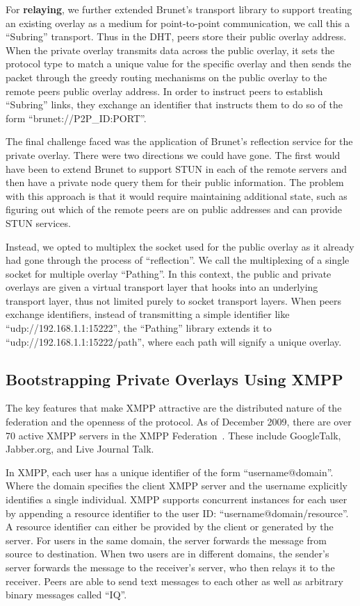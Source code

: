 \documentclass[conference]{IEEEtran}
\begin{document}
For \textbf{relaying}, we further extended Brunet's transport library to
support treating an existing overlay as a medium for point-to-point
communication, we call this a ``Subring'' transport.  Thus in the DHT, peers
store their public overlay address.  When the private overlay transmits data
across the public overlay, it sets the protocol type to match a unique value
for the specific overlay and then sends the packet through the greedy routing
mechanisms on the public overlay to the remote peers public overlay address.
In order to instruct peers to establish ``Subring'' links, they exchange an
identifier that instructs them to do so of the form ``brunet://P2P\_ID:PORT''.

The final challenge faced was the application of Brunet's reflection service
for the private overlay.  There were two directions we could have gone.  The
first would have been to extend Brunet to support STUN in each of the remote
servers and then have a private node query them for their public information.
The problem with this approach is that it would require maintaining additional
state, such as figuring out which of the remote peers are on public addresses
and can provide STUN services.

Instead, we opted to multiplex the socket used for the public overlay as it
already had gone through the process of ``reflection''.  We call the
multiplexing of a single socket for multiple overlay ``Pathing''.  In this
context, the public and private overlays are given a virtual transport layer
that hooks into an underlying transport layer, thus not limited purely to
socket transport layers.  When peers exchange identifiers, instead of
transmitting a simple identifier like ``udp://192.168.1.1:15222'', the
``Pathing'' library extends it to ``udp://192.168.1.1:15222/path'', where each
path will signify a unique overlay.

\subsection{Bootstrapping Private Overlays Using XMPP}
\label{xmpp_bootstrapping}

The key features that make XMPP attractive are the distributed nature of the
federation and the openness of the protocol.  As of December 2009, there are
over 70 active XMPP servers in the XMPP Federation~\cite{xmpp_servers}.  These
include GoogleTalk, Jabber.org, and Live Journal Talk.

In XMPP, each user has a unique identifier of the form ``username@domain''.
Where the domain specifies the client XMPP server and the username explicitly
identifies a single individual.  XMPP supports concurrent instances for each
user by appending a resource identifier to the user ID:
``username@domain/resource''.  A resource identifier can either be provided by
the client or generated by the server.  For users in the same domain, the
server forwards the message from source to destination.  When two users are in
different domains, the sender's server forwards the message to the receiver's
server, who then relays it to the receiver.  Peers are able to send text
messages to each other as well as arbitrary binary messages called ``IQ''.
\end{document}
